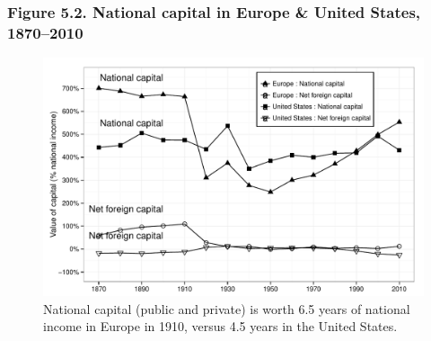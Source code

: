 \documentclass[t]{beamer}\usepackage[]{graphicx}\usepackage[]{color}
\newenvironment{knitrout}{}{} %
\begin{document}
\begin{frame}[label=Figure_5_2]
\frametitle{Figure 5.2. National capital in Europe \& United States, 1870--2010}
\begin{figure}[t]
\begin{minipage}[b]{\textwidth}
\centering
\begin{knitrout}\footnotesize
{}\color{fgcolor}

{\centering \includegraphics[width=1\linewidth]{figures/bw/Figure_5_2} 

}



\end{knitrout}
\caption{National capital (public and private) is worth 6.5 years of national income in Europe in 1910, versus 4.5 years in the United States.}
\end{minipage}
\end{figure}
\end{frame}
\end{document}
